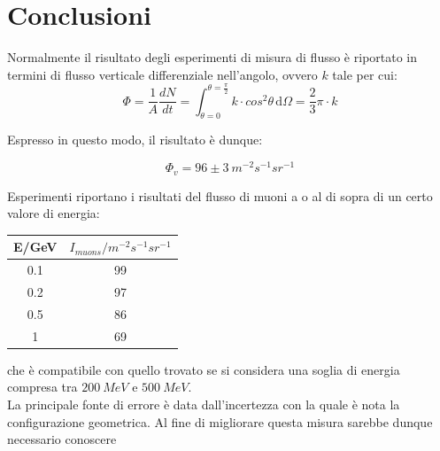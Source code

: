 \documentclass[11pt]{article}
\begin{document}
\section{Conclusioni}
Normalmente il risultato degli esperimenti di misura di flusso è riportato in termini di flusso verticale differenziale nell'angolo, ovvero $k$ tale per cui:
\begin{equation}
\Phi = \frac{1}{A}\frac{dN}{dt}=\int_{\theta=0}^{\theta=\frac{\pi}{2}}  \! k\cdot cos^2{\theta} \, \mathrm{d}\Omega = \frac{2}{3}\pi\cdot k
\end{equation}

Espresso in questo modo, il risultato è dunque:

\begin{equation}
\Phi_v = 96 \pm 3 \ m^{-2}s^{-1} sr^{-1}
\end{equation}





Esperimenti\cite{Flusso_NPL} riportano i risultati del flusso di muoni a o al di sopra di un certo valore di energia: \\
\vspace{0.8 cm}
\begin{tabular}{|c|c|}
\hline 
E/GeV & $I_{muons}/m^{-2} s^{-1} sr^{-1}$ \\ 
\hline 
0.1 & 99 \\ 
\hline 
0.2 & 97 \\ 
\hline 
0.5 & 86 \\ 
\hline 
1 & 69 \\ 
\hline 
\end{tabular} 
\vspace{0.8 cm}

che è compatibile con quello trovato se si considera una soglia di energia compresa tra $200 \ MeV$ e $500 \ MeV$. \\
La principale fonte di errore è data dall'incertezza con la quale è nota la configurazione geometrica. Al fine di migliorare questa misura sarebbe dunque necessario conoscere 


\end{document}
